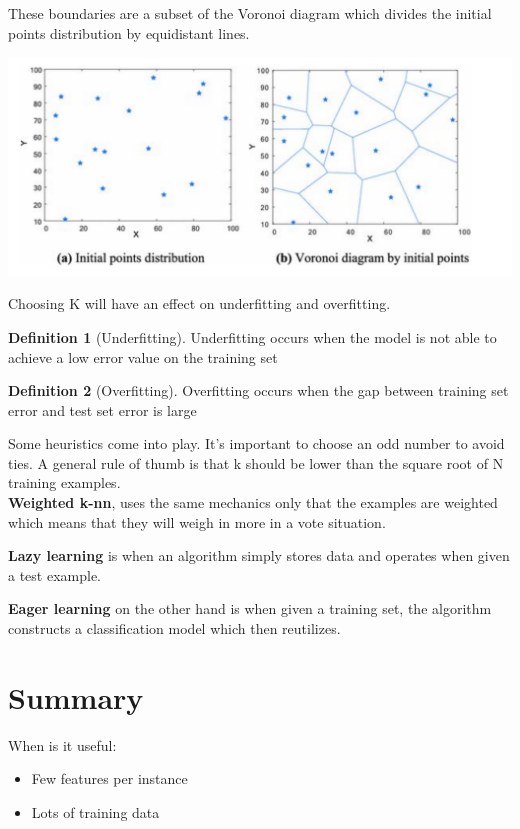 \documentclass[oneside]{book}
\theoremstyle{definition}
\newtheorem{definition}{Definition}[section]
\begin{document}
These boundaries are a subset of the Voronoi diagram which divides the initial points distribution by equidistant lines. 

\includegraphics[scale=0.2]{voronoi}

Choosing K will have an effect on underfitting and overfitting.

\begin{definition}[Underfitting]
	Underfitting occurs when the model is not able to achieve a low error value on the training set
\end{definition}

\begin{definition}[Overfitting]
	Overfitting occurs when the gap between training set error and test set error is large
\end{definition}

Some heuristics come into play. It's important to choose an odd number to avoid ties. A general rule of thumb is that k should be lower than the square root of N training examples.
\\
\textbf{Weighted k-nn}, uses the same mechanics only that the examples are weighted which means that they will weigh in more in a vote situation.

\textbf{Lazy learning} is when an algorithm simply stores data and operates when given a test example.

\textbf{Eager learning} on the other hand is when given a training set, the algorithm constructs a classification model which then reutilizes. 

\section{Summary}
When is it useful:
\begin{itemize}
	\item Few features per instance
	\item Lots of training data
\end{itemize}
\end{document}
